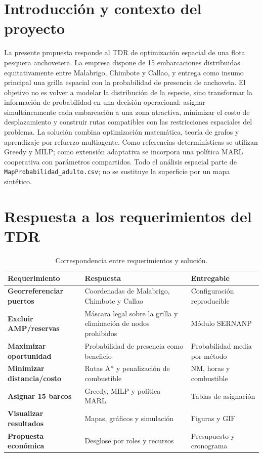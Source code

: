 \section{Introducción y contexto del proyecto}
La presente propuesta responde al TDR de optimización espacial de una flota pesquera anchovetera. La empresa dispone de 15 embarcaciones distribuidas equitativamente entre Malabrigo, Chimbote y Callao, y entrega como insumo principal una grilla espacial con la probabilidad de presencia de anchoveta.
El objetivo no es volver a modelar la distribución de la especie, sino transformar la información de probabilidad en una decisión operacional: asignar simultáneamente cada embarcación a una zona atractiva, minimizar el costo de desplazamiento y construir rutas compatibles con las restricciones espaciales del problema.
La solución combina optimización matemática, teoría de grafos y aprendizaje por refuerzo multiagente. Como referencias determinísticas se utilizan Greedy y MILP; como extensión adaptativa se incorpora una política MARL cooperativa con parámetros compartidos. Todo el análisis espacial parte de \texttt{MapProbabilidad\_adulto.csv}; no se sustituye la superficie por un mapa sintético.
\section{Respuesta a los requerimientos del TDR}
\begin{table}[H]
\centering\small
\caption{Correspondencia entre requerimientos y solución.}
\begin{tabularx}{\textwidth}{>{\bfseries}p{3.2cm} X X}
\toprule
Requerimiento & Respuesta & Entregable \\
\midrule
Georreferenciar puertos & Coordenadas de Malabrigo, Chimbote y Callao & Configuración reproducible \\
Excluir AMP/reservas & Máscara legal sobre la grilla y eliminación de nodos prohibidos & Módulo SERNANP \\
Maximizar oportunidad & Probabilidad de presencia como beneficio & Probabilidad media por método \\
Minimizar distancia/costo & Rutas A* y penalización de combustible & NM, horas y combustible \\
Asignar 15 barcos & Greedy, MILP y política MARL & Tablas de asignación \\
Visualizar resultados & Mapas, gráficos y simulación & Figuras y GIF \\
Propuesta económica & Desglose por roles y recursos & Presupuesto y cronograma \\
\bottomrule
\end{tabularx}
\end{table}

